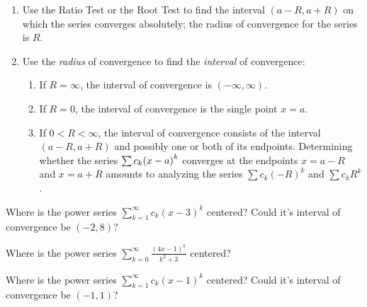 \documentclass[../mathNotesPreamble]{subfiles}
\begin{document}
  \begin{thmBox*}
    \begin{enumerate}
      \item Use the Ratio Test or the Root Test to find the interval $(a-R, a+R)$ on which the series converges absolutely; the radius of convergence for the series is $R$.
      \item Use the \textit{radius} of convergence to find the \textit{interval} of convergence:
        \begin{enumerate}[label=\textbullet]
          \item If $R=\infty$, the interval of convergence is $(-\infty,\infty)$.
          \item If $R=0$, the interval of convergence is the single point $x=a$.
          \item If $0<R<\infty$, the interval of convergence consists of the interval $(a-R,a+R)$ and possibly one or both of its endpoints. Determining whether the series $\sum c_k{\left(x-a\right)}^k$ converges at the endpoints $x=a-R$ and $x=a+R$ amounts to analyzing the series $\sum c_k(-R)^k$ and $\sum c_kR^k$.
        \end{enumerate}
    \end{enumerate}
  \end{thmBox*}
  \begin{ex*}[\textcolor{blue}{LC 28.1}]
    Where is the power series $\displaystyle\sum_{k=1}^\infty c_k(x-3)^k$ centered?\newline 
    Could it's interval of convergence be $(-2,8)$?
  \end{ex*}

  \begin{ex*}[\textcolor{blue}{LC 28.2}]
    Where is the power series $\displaystyle\sum_{k=0}^\infty \frac{(4x-1)^k}{k^2+3}$ centered?
  \end{ex*}
  
  \begin{ex*}[\textcolor{blue}{LC 28.3}]
    Where is the power series $\displaystyle\sum_{k=1}^\infty c_k(x-1)^k$ centered?\newline 
    Could it's interval of convergence be $(-1,1)$?
  \end{ex*}
  \pagebreak
\end{document}
